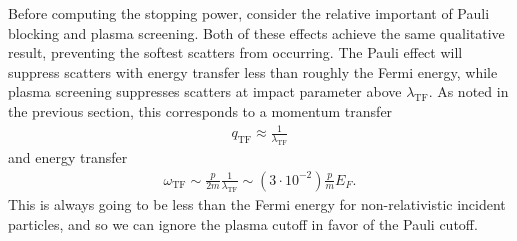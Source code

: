 \documentclass[twocolumn, preprintnumbers,amsmath,amssymb,prd, superscriptaddress]{revtex4}
\begin{document}
\begin{appendices}
Before computing the stopping power, consider the relative important of Pauli blocking and plasma screening.
Both of these effects achieve the same qualitative result, preventing the softest scatters from occurring.
The Pauli effect will suppress scatters with energy transfer less than roughly the Fermi energy, while plasma screening suppresses scatters at impact parameter above $\lambda_\text{TF}$.
As noted in the previous section, this corresponds to a momentum transfer
\begin{align}
      q_\text{TF} \approx \frac{1}{\lambda_\text{TF}}
\end{align}
and energy transfer
\begin{align}
  \label{eq:cuttoff_compare}
  \omega_\text{TF} \sim \frac{p}{2m} \frac{1}{\lambda_\text{TF}}
         \sim (3 \cdot 10^{-2}) \frac{p}{m} E_F.
\end{align}
This is always going to be less than the Fermi energy for non-relativistic incident particles, and so we can ignore the plasma cutoff in favor of the Pauli cutoff.


\end{appendices}
\end{document}
